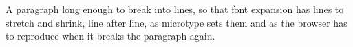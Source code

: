 \documentclass{article}
\begin{document}
A paragraph long enough to break into lines, so that font expansion has
lines to stretch and shrink, line after line, as microtype sets them and as
the browser has to reproduce when it breaks the paragraph again.
\end{document}
